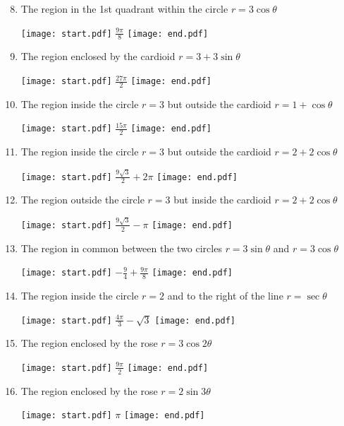 \documentclass[12pt]{article}
\begin{document}
\begin{enumerate}
\setcounter{enumi}{7}

\item The region in the 1st quadrant within the circle $r=3\cos{\theta}$ 

\texttt{[image: start.pdf]}
{{$\frac{9\pi}{8}$}}
\texttt{[image: end.pdf]}


\item The region enclosed by the cardioid $r=3+3\sin{\theta}$ 

\texttt{[image: start.pdf]}
{{$\frac{27\pi}{2}$}}
\texttt{[image: end.pdf]}


\item The region inside the circle $r=3$ but outside the cardioid $r=1+\cos{\theta}$ 

\texttt{[image: start.pdf]}
{{$\frac{15\pi}{2}$}}
\texttt{[image: end.pdf]}


\item The region inside the circle $r=3$ but outside the cardioid $r=2+2\cos{\theta}$ 

\texttt{[image: start.pdf]}
{{$\frac{9\sqrt{3}}{2}+2\pi$}}
\texttt{[image: end.pdf]}


\item The region outside the circle $r=3$ but inside the cardioid $r=2+2\cos{\theta}$ 

\texttt{[image: start.pdf]}
{{$\frac{9\sqrt{3}}{2}-\pi$}}
\texttt{[image: end.pdf]}


\item The region in common between the two circles $r=3\sin{\theta}$ and $r=3\cos{\theta}$ 

\texttt{[image: start.pdf]}
{{$-\frac{9}{4}+\frac{9\pi}{8}$}}
\texttt{[image: end.pdf]}


\item The region inside the circle $r=2$ and to the right of the line $r=\sec{\theta}$ 

\texttt{[image: start.pdf]}
{{$\frac{4\pi}{3}-\sqrt{3}$}}
\texttt{[image: end.pdf]}


\item The region enclosed by the rose $r=3\cos{2\theta}$ 

\texttt{[image: start.pdf]}
{{$\frac{9\pi}{2}$}}
\texttt{[image: end.pdf]}


\item The region enclosed by the rose $r=2\sin{3\theta}$ 

\texttt{[image: start.pdf]}
{{$\pi$}}
\texttt{[image: end.pdf]}



\end{enumerate}
\end{document}
